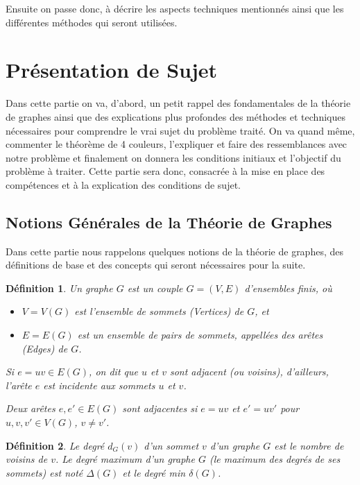 \documentclass[10pt,a4paper]{article}
\newtheorem{definition}{Définition}
\begin{document}
Ensuite on passe donc, à décrire les aspects techniques mentionnés ainsi que les différentes méthodes qui seront utilisées.

\section{Présentation de Sujet}

Dans cette partie on va, d'abord, un petit rappel des fondamentales de la théorie de graphes ainsi que des explications plus profondes des méthodes et techniques nécessaires pour comprendre le vrai sujet du problème traité. On va quand même, commenter le théorème de 4 couleurs, l'expliquer et faire des ressemblances avec notre problème et finalement on donnera les conditions initiaux et l'objectif du problème à traiter. Cette partie sera donc, consacrée à la mise en place des compétences et à la explication des conditions de sujet.

\subsection{Notions Générales de la Théorie de Graphes}

Dans cette partie nous rappelons quelques notions de la théorie de graphes,  des définitions de base et des concepts qui seront nécessaires pour la suite. 

\begin{definition}
Un \emph{graphe} $G$ est un couple $G = (V,E)$ d'ensembles finis, où 
\begin{itemize}
\item $V=V(G)$ est l'ensemble de \emph{sommets (Vertices)} de $G$, et
\item $E=E(G)$ est un ensemble de pairs de sommets, appellées des \emph{arêtes (Edges)} de $G$.
\end{itemize}
Si $e = uv \in E(G)$, on dit que $u$ et $v$ sont \emph{adjacent} (ou \emph{voisins}), d'ailleurs, l'arête $e$ est \emph{incidente} aux sommets $u$ et $v$.

Deux arêtes $e,e'\in E(G)$ sont \emph{adjacentes} si $e=uv$ et $e'=uv'$ pour $u,v,v'\in V(G)$, $v\ne v'$.
\end{definition}

\begin{definition}
Le \emph{degré} $d_{G}(v)$ d'un sommet $v$ d'un graphe $G$ est le nombre de voisins de $v$. Le degré maximum d'un graphe $G$ (le maximum des degrés de ses sommets) est noté $\Delta(G)$ et le degré min $\delta(G)$.
\end{definition}
\end{document}
